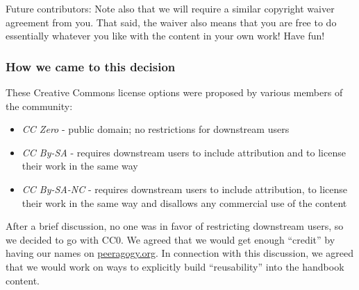 Future contributors: Note also that we will require a similar
copyright waiver agreement from you.  That said, the waiver also means
that you are free to do essentially whatever you like with the content
in your own work!  Have fun!

\subsubsection{How we came to this decision}

These Creative Commons license options were proposed by various members
of the community:

\begin{itemize}
\item
  \emph{CC Zero} - public domain; no restrictions for downstream users
\item
  \emph{CC By-SA} - requires downstream users to include attribution and
  to license their work in the same way
\item
  \emph{CC By-SA-NC} - requires downstream users to include attribution,
  to license their work in the same way and disallows any commercial use
  of the content
\end{itemize}
After a brief discussion, no one was in favor of restricting downstream
users, so we decided to go with CC0. We agreed that we would get enough
``credit'' by having our names on
\href{http://peeragogy.org/}{peeragogy.org}. In connection with this
discussion, we agreed that we would work on ways to explicitly build
``reusability'' into the handbook content.
